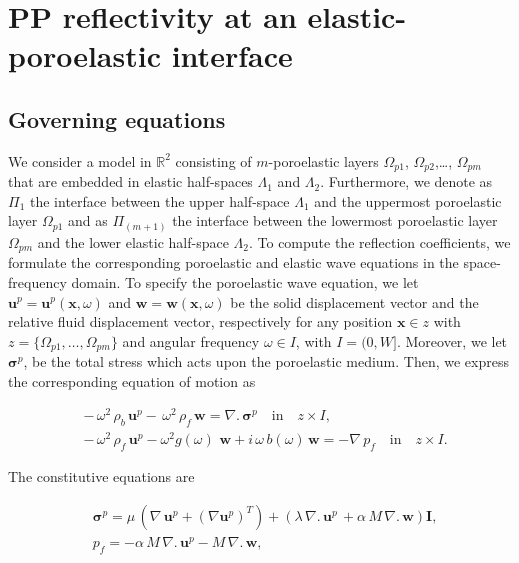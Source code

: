 \documentclass[draft]{agujournal2019}
\begin{document}
\appendix
\section{PP reflectivity  at an elastic-poroelastic interface}

\subsection{Governing equations}
We consider a model in $\mathbb R^2$ consisting of 
$m$-poroelastic layers  $\Omega_{p1}$,  $\Omega_{p2}$,\dots, $\Omega_{pm}$ that are embedded in elastic half-spaces $\Lambda_1$ and $\Lambda_2$. Furthermore, we denote as $\Pi_1$  the interface between the upper half-space $\Lambda_1$ and the uppermost poroelastic layer $\Omega_{p1}$ and as $\Pi_{(m+1)}$ the interface between the lowermost poroelastic layer $\Omega_{pm}$ and the lower elastic half-space $\Lambda_2$. To compute the  reflection coefficients, we formulate the corresponding poroelastic and elastic wave equations in the space-frequency domain. To specify the poroelastic wave equation,  we let $\bm{u}^p =\bm{u}^p( \bm{x}, \omega)$ and $\bm{w} =\bm{w}( \bm{x}, \omega)$  be the solid displacement vector and the relative fluid displacement vector, respectively for any position $\bm{x} \in z$ with $z=\{\Omega_{p1},\dots,\Omega_{pm}\}$  and angular frequency $\omega \in I$, with $I =(0,W]$. Moreover, we let $\bm {\sigma}^p$, be the total stress which acts upon the poroelastic medium. Then, we express the corresponding equation of motion as
\begin{linenomath*}
\begin{equation}\label{Eq.a1}
\begin{split}
& -\,\omega^2  \, \rho_b  \, \bm{u}^p -  \,\omega^2 \, \rho_f \, \bm{w}= \nabla . \, \bm{\sigma}^p \quad  \textrm{in} \quad z \times I, \\
& -\,\omega^2  \, \rho_f \, \bm{u}^p - \omega^2 g(\omega) \, \, \bm{w} + i \, \omega \, b(\omega) \, \bm{w} = - \nabla \, p_f \quad  \textrm{in} \quad z \times I.
\end{split}
\end{equation}
\end{linenomath*}
The constitutive equations are
\begin{linenomath*}
\begin{equation}\label{Eq.a2}
\begin{split}
& \bm{\sigma}^p = \mu \,  \left( \nabla \,\bm{u}^p + ({\nabla  \bm{u}^p})^T  \right) +  \left( \lambda \, \nabla . \, \bm{u}^p\, + \alpha \,M \, \nabla . \, \bm{w} \right) \bm{I}, \\
&p_f=- \alpha \, M \, \nabla . \, \bm{u}^p - M \, \nabla . \, \bm{w},  \end{split}
\end{equation}
\end{linenomath*}
\end{document}
